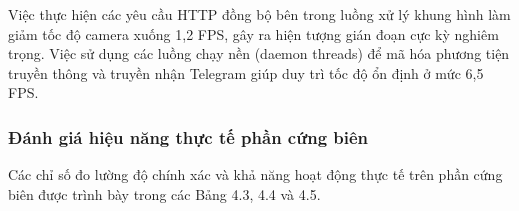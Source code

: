 \documentclass[12pt,a4paper]{article}
\begin{document}
\begin{table}[h]
    \centering
    \caption{Đánh giá hiệu năng của các bộ điều phối thông báo (Kết quả thực tế thực nghiệm trên Pi 4)}
    \label{tab:latency_results}
\end{table}

Việc thực hiện các yêu cầu HTTP đồng bộ bên trong luồng xử lý khung hình làm giảm tốc độ camera xuống 1,2 FPS, gây ra hiện tượng gián đoạn cực kỳ nghiêm trọng. Việc sử dụng các luồng chạy nền (daemon threads) để mã hóa phương tiện truyền thông và truyền nhận Telegram giúp duy trì tốc độ ổn định ở mức 6,5 FPS.

\subsubsection*{Đánh giá hiệu năng thực tế phần cứng biên}
Các chỉ số đo lường độ chính xác và khả năng hoạt động thực tế trên phần cứng biên được trình bày trong các Bảng 4.3, 4.4 và 4.5.

\begin{table}[h]
    \centering
    \caption{Độ chính xác xác thực khuôn mặt theo góc nhìn camera (Kết quả đo lường thực tế)}
    \label{tab:face_bench}
\end{table}
\end{document}
